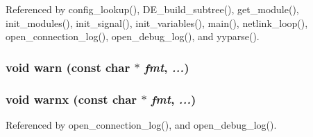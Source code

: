 Referenced by config\_\-lookup(), DE\_\-build\_\-subtree(), get\_\-module(), init\_\-modules(), init\_\-signal(), init\_\-variables(), main(), netlink\_\-loop(), open\_\-connection\_\-log(), open\_\-debug\_\-log(), and yyparse().
\subsubsection[{warn}]{\setlength{\rightskip}{0pt plus 5cm}void warn (const char $\ast$ {\em fmt}, \/   {\em ...})}\label{err_8c_f80d19f1297a11626fab61a248959c71}


\subsubsection[{warnx}]{\setlength{\rightskip}{0pt plus 5cm}void warnx (const char $\ast$ {\em fmt}, \/   {\em ...})}\label{err_8c_58f3d9691c146f86e562022d39567b7f}




Referenced by open\_\-connection\_\-log(), and open\_\-debug\_\-log().